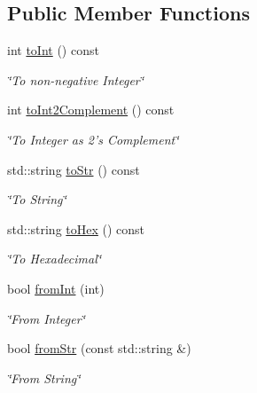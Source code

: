 \subsection*{Public Member Functions}
\begin{DoxyCompactItemize}
\item 
int \hyperlink{classWord_a19303d963626549830a8da33d863bd6d}{toInt} () const 
\begin{DoxyCompactList}\small\item\em \char`\"{}To non-\/negative Integer\char`\"{} \item\end{DoxyCompactList}\item 
int \hyperlink{classWord_a3d771d68afd4a70d279af8bd9cd6bef9}{toInt2Complement} () const 
\begin{DoxyCompactList}\small\item\em \char`\"{}To Integer as 2's Complement\char`\"{} \item\end{DoxyCompactList}\item 
std::string \hyperlink{classWord_ac2ca49ef4da2fb57172fe057849e53fa}{toStr} () const 
\begin{DoxyCompactList}\small\item\em \char`\"{}To String\char`\"{} \item\end{DoxyCompactList}\item 
std::string \hyperlink{classWord_ab797467868642bb096bc4c9b1ed0a2f0}{toHex} () const 
\begin{DoxyCompactList}\small\item\em \char`\"{}To Hexadecimal\char`\"{} \item\end{DoxyCompactList}\item 
bool \hyperlink{classWord_ad6499f93b487d6d550a3fd4adcee9c8d}{fromInt} (int)
\begin{DoxyCompactList}\small\item\em \char`\"{}From Integer\char`\"{} \item\end{DoxyCompactList}\item 
bool \hyperlink{classWord_a614b52f3312d82ac5681403651040714}{fromStr} (const std::string \&)
\begin{DoxyCompactList}\small\item\em \char`\"{}From String\char`\"{} \item\end{DoxyCompactList}\item 

\end{DoxyCompactItemize}
